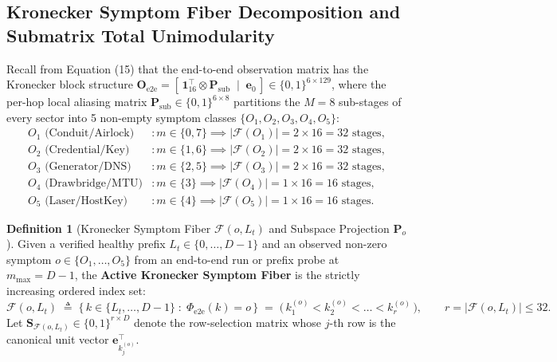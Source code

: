 \documentclass[11pt,a4paper]{article}
\theoremstyle{definition}
\newtheorem{definition}[theorem]{Definition}
\theoremstyle{remark}
\begin{document}
\subsection{Kronecker Symptom Fiber Decomposition and Submatrix Total Unimodularity}

Recall from Equation (15) that the end-to-end observation matrix has the Kronecker block structure $\bm{O}_{\text{e2e}} = [\,\bm{1}_{16}^\top \otimes \bm{P}_{\text{sub}} \;\mid\; \bm{e}_0\,] \in \{0,1\}^{6 \times 129}$, where the per-hop local aliasing matrix $\bm{P}_{\text{sub}} \in \{0,1\}^{6 \times 8}$ partitions the $M=8$ sub-stages of every sector into 5 non-empty symptom classes $\{O_1, O_2, O_3, O_4, O_5\}$:
\begin{equation}
    \begin{aligned}
        O_1 \text{ (Conduit/Airlock)} &: m \in \{0, 7\} \implies |\mathcal{F}(O_1)| = 2 \times 16 = 32\text{ stages}, \\
        O_2 \text{ (Credential/Key)}  &: m \in \{1, 6\} \implies |\mathcal{F}(O_2)| = 2 \times 16 = 32\text{ stages}, \\
        O_3 \text{ (Generator/DNS)}   &: m \in \{2, 5\} \implies |\mathcal{F}(O_3)| = 2 \times 16 = 32\text{ stages}, \\
        O_4 \text{ (Drawbridge/MTU)}  &: m \in \{3\}    \implies |\mathcal{F}(O_4)| = 1 \times 16 = 16\text{ stages}, \\
        O_5 \text{ (Laser/HostKey)}   &: m \in \{4\}    \implies |\mathcal{F}(O_5)| = 1 \times 16 = 16\text{ stages}.
    \end{aligned}
\end{equation}

\begin{definition}[Kronecker Symptom Fiber $\mathcal{F}(o, L_t)$ and Subspace Projection $\bm{P}_o$]
Given a verified healthy prefix $L_t \in \{0, \dots, D-1\}$ and an observed non-zero symptom $o \in \{O_1, \dots, O_5\}$ from an end-to-end run or prefix probe at $m_{\max} = D-1$, the \textbf{Active Kronecker Symptom Fiber} is the strictly increasing ordered index set:
\begin{equation}
    \mathcal{F}(o, L_t) \;\triangleq\; \big\{\, k \in \{L_t, \dots, D-1\} \;:\; \Phi_{\text{e2e}}(k) = o \,\big\} \;=\; \big(\, k_1^{(o)} < k_2^{(o)} < \dots < k_{r}^{(o)} \,\big),
    \qquad r = |\mathcal{F}(o, L_t)| \le 32.
\end{equation}
Let $\bm{S}_{\mathcal{F}(o, L_t)} \in \{0,1\}^{r \times D}$ denote the row-selection matrix whose $j$-th row is the canonical unit vector $\bm{e}_{k_j^{(o)}}^\top$.
\end{definition}
\end{document}
